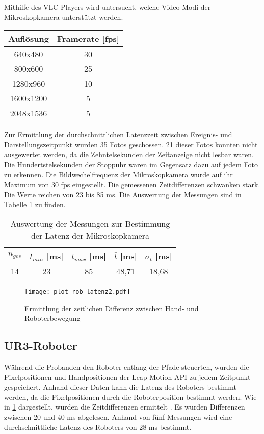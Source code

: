 Mithilfe des VLC-Players wird untersucht, welche Video-Modi der Mikroskopkamera unterstützt werden. 
\begin{center}
	\begin{tabular}{|c|c|}
		\hline 
		Auflösung & Framerate [fps] \\ 
		\hline 
		640x480 & 30 \\ 
		\hline 
		800x600 & 25 \\ 
		\hline 
		1280x960 & 10 \\ 
		\hline 
		1600x1200 & 5 \\ 
		\hline 
		2048x1536 & 5 \\ 
		\hline 
	\end{tabular} 
\end{center}
Zur Ermittlung der durchschnittlichen Latenzzeit zwischen Ereignis- und Darstellungszeitpunkt wurden 35 Fotos geschossen. 21 dieser Fotos konnten nicht ausgewertet werden, da die Zehntelsekunden der Zeitanzeige nicht lesbar waren. Die Hundertstelsekunden der Stoppuhr waren im Gegensatz dazu auf jedem Foto zu erkennen. Die Bildwechelfrequenz der Mikroskopkamera wurde auf ihr Maximum von 30 fps eingestellt. Die gemessenen Zeitdifferenzen schwanken stark. Die Werte reichen von 23 bis 85 ms. Die Auswertung der Messungen sind in Tabelle \ref{table latenz cam} zu finden.

\begin{table}[htb]
	\caption{Auswertung der Messungen zur Bestimmung der Latenz der Mikroskopkamera}
	\label{table latenz cam}
	\begin{center}
		\begin{tabular}{|c|c|c|c|c|}
			\hline 
			 $n_{ges}$ & $t_{min}$ [ms] & $t_{max}$ [ms] & $\bar{t}$ [ms] & $\sigma_{t}$ [ms] \\ 
			\hline 
			14 & 23 & 85 & 48,71 & 18,68 \\ 
			\hline 
		\end{tabular} 
	\end{center}
\end{table}
\begin{figure}[H]
	\centering
	\texttt{[image: plot\_rob\_latenz2.pdf]}
	\caption{Ermittlung der zeitlichen Differenz zwischen Hand- und Roboterbewegung}
	\label{fig:plot_rob_latenz}
\end{figure}

\subsection{UR3-Roboter}



Während die Probanden den Roboter entlang der Pfade steuerten, wurden die Pixelpositionen und Handpositionen der Leap Motion API zu jedem Zeitpunkt gespeichert. Anhand dieser Daten kann die Latenz des Roboters bestimmt werden, da die Pixelpositionen durch die Roboterposition bestimmt werden. Wie in \ref{fig:plot_rob_latenz} dargestellt, wurden die Zeitdifferenzen ermittelt . Es wurden Differenzen zwischen 20 und 40 ms abgelesen. Anhand von fünf Messungen wird eine durchschnittliche Latenz des Roboters von 28 ms bestimmt.